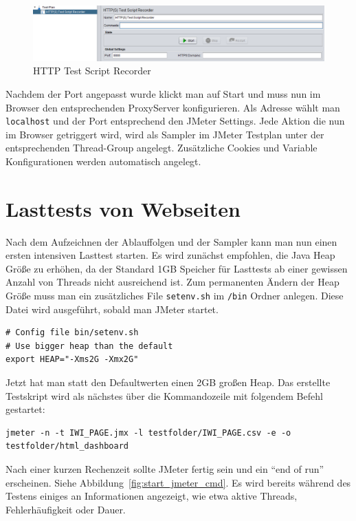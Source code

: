 \documentclass[a4paper,12pt]{article}
\newcommand{\codeInLine}[1]{%
\colorbox{graybackgroundColor}{\lstinline{#1}} %
}
\begin{document}
\begin{figure}[htb]%
 \centering
    \includegraphics[width=1\textwidth]{bilder/https_recorder.png}
  \caption{HTTP Test Script Recorder}
  \label{fig:https_recorder}
\end{figure}

Nachdem der Port angepasst wurde klickt man auf Start und muss nun im Browser den entsprechenden ProxyServer konfigurieren. Als Adresse wählt man \codeInLine{localhost} und der Port entsprechend den JMeter Settings. Jede Aktion die nun im Browser getriggert wird, wird als Sampler im JMeter Testplan unter der entsprechenden Thread-Group angelegt. Zusätzliche Cookies und Variable Konfigurationen werden automatisch angelegt.

\section{Lasttests von Webseiten}
Nach dem Aufzeichnen der Ablauffolgen und der Sampler kann man nun einen ersten intensiven Lasttest starten. Es wird zunächst empfohlen, die Java Heap Größe zu erhöhen, da der Standard 1GB Speicher für Lasttests ab einer gewissen Anzahl von Threads nicht ausreichend ist. Zum permanenten Ändern der Heap Größe muss man ein zusätzliches File \codeInLine{setenv.sh} im \codeInLine{/bin} Ordner anlegen. Diese Datei wird ausgeführt, sobald man JMeter startet. 

\begin{lstlisting}
# Config file bin/setenv.sh
# Use bigger heap than the default
export HEAP="-Xms2G -Xmx2G"
\end{lstlisting}

Jetzt hat man statt den Defaultwerten einen 2GB großen Heap. Das erstellte Testskript wird als nächstes über die Kommandozeile mit folgendem Befehl gestartet:

\begin{lstlisting}
jmeter -n -t IWI_PAGE.jmx -l testfolder/IWI_PAGE.csv -e -o testfolder/html_dashboard
\end{lstlisting} 

Nach einer kurzen Rechenzeit sollte JMeter fertig sein und ein "`end of run"' erscheinen. Siehe Abbildung~\ref{fig:start_jmeter_cmd}. Es wird bereits während des Testens einiges an Informationen angezeigt, wie etwa aktive Threads, Fehlerhäufigkeit oder Dauer. 
\end{document}
